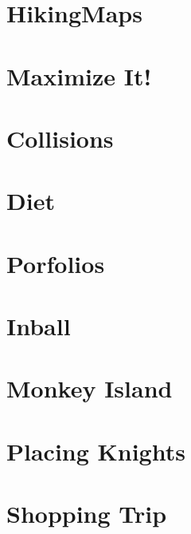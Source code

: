 \documentclass[a4paper, 10pt]{article}
\let\stdsection\section
\renewcommand\section{\newpage\stdsection}
\newcommand{\includecode}[1]{
    }
\begin{document}
    \section{HikingMaps}
        \includecode{../problems/w07/HikingMaps/HikingMaps1.cpp}
    
    
    \section{Maximize It!}
        \includecode{../problems/w08/Maximize_It/MaximizeIt1.cpp}
        
    \section{Collisions}
        \includecode{../problems/w08/Collisions/Collisions1.cpp}
        
    \section{Diet}
        \includecode{../problems/w08/Diet/Diet1.cpp}
        
    \section{Porfolios}
        \includecode{../problems/w08/Portfolios/Portfolios1.cpp}
    
    \section{Inball}
        \includecode{../problems/w08/Inball/Inball1.cpp}
    
    
    \section{Monkey Island}
        \includecode{../problems/w09/Monkey_Island/MonkeyIsland1.cpp}
        
    \section{Placing Knights}
        \includecode{../problems/w09/Placing_Knights/PlacingKnights1.cpp}
        
    \section{Shopping Trip}
        \includecode{../problems/w09/Shopping_Trip/ShoppingTrip1.cpp}
        
\end{document}
